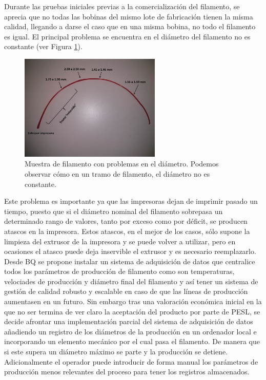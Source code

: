 Durante las pruebas iniciales previas a la comercialización del filamento, se aprecia que no todas las bobinas del mismo lote de fabricación tienen la misma calidad, llegando a darse el caso que en una misma bobina, no todo el filamento es igual. El principal problema se encuentra en el diámetro del filamento no es constante (ver Figura \ref{fig:muestra_filamento}).

\begin{figure}[!ht]
    \centering
    \includegraphics[width=0.6\textwidth]{images/atasco_rojo.jpg}
    \caption[Muestra de filamento con problemas en el diámetro]{Muestra de filamento con problemas en el diámetro. Podemos observar cómo en un tramo de filamento, el diámetro no es constante.}
    \label{fig:muestra_filamento}
\end{figure}

Este problema es importante ya que las impresoras dejan de imprimir pasado un tiempo, puesto que si el diámetro nominal del filamento sobrepasa un determinado rango de valores, tanto por exceso como por déficit, se producen atascos en la impresora. Estos atascos, en el mejor de los casos, sólo supone la limpieza del extrusor de la impresora y se puede volver a utilizar, pero en ocasiones el atasco puede deja inservible el extrusor y es necesario reemplazarlo.\\

Desde BQ se propone instalar un sistema de adquisición de datos que centralice todos los parámetros de producción de filamento como son temperaturas, velociades de producción y diámetro final del filamento y así tener un sistema de gestión de calidad robusto y escalable en caso de que las líneas de producción aumentasen en un futuro. Sin embargo tras una valoración económica inicial en la que no ser termina de ver claro la aceptación del producto por parte de PESL, se decide afrontar una implementación parcial del sistema de adquisición de datos añadiendo un registro de los diámetros de la producción en un ordenador local e incorporando un elemento mecánico por el cual pasa el filamento. De manera que si este supera un diámetro máximo se parte y la producción se detiene. Adicionalmente el operador puede introducir de forma manual los parámetros de producción menos relevantes del proceso para tener los registros almacenados.\\

